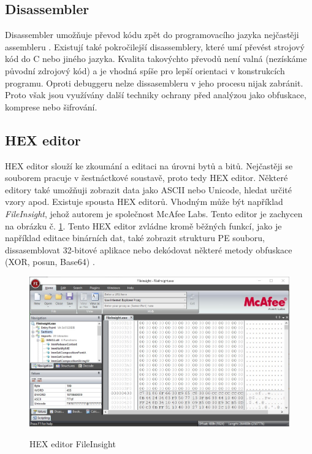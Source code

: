 \subsection{Disassembler}

Disassembler umožňuje převod kódu zpět do programovacího jazyka nejčastěji assembleru \cite{debugger_dissasembler}. Existují také pokročilejší disassemblery, které umí převést strojový kód do C nebo jiného jazyka. Kvalita takovýchto převodů není valná (nezískáme původní zdrojový kód) a je vhodná spíše pro lepší orientaci v konstrukcích programu. Oproti debuggeru nelze dissasembleru v jeho procesu nijak zabránit. Proto však jsou využívány další techniky ochrany před analýzou jako obfuskace, komprese nebo šifrování.


\subsection{HEX editor}

HEX editor slouží ke zkoumání a editaci na úrovni bytů a bitů. Nejčastěji se souborem pracuje v šestnáctkové soustavě, proto tedy HEX editor. Některé editory také umožňuji zobrazit data jako ASCII nebo Unicode, hledat určité vzory apod. Existuje spousta HEX editorů. Vhodným  může být například \emph{FileInsight}, jehož autorem je společnost McAfee Labs. Tento editor je zachycen na obrázku č. \ref{fig:hexeditor}. Tento HEX editor zvládne kromě běžných funkcí, jako je například editace binárních dat, také zobrazit strukturu PE souboru, dissasemblovat 32-bitové aplikace nebo dekódovat některé metody obfuskace (XOR, posun, Base64) \cite{hexeditors}.

\begin{figure}[!ht]
    \centering
    \caption{HEX editor FileInsight}
    \includegraphics[width=150mm,scale=0.5]{Figures/obrazky/MCAfee-Insights.jpg}
    \label{fig:hexeditor}
\end{figure}

